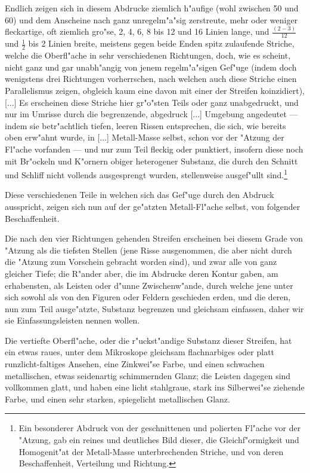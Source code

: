 \documentclass[a4paper, 11pt, oneside, german]{article}
\begin{document}
Endlich zeigen sich in diesem Abdrucke ziemlich h"aufige (wohl zwischen 50 und 60) und dem Anscheine nach ganz unregelm"a"sig zerstreute, mehr oder weniger fleckartige, oft ziemlich gro"se, 2, 4, 6, 8 bis 12 und 16 Linien lange, und $\frac{(2-3)}{12}$ und $\frac{1}{2}$ bis 2 Linien breite, meistens gegen beide Enden spitz zulaufende Striche, welche die Oberfl"ache in sehr verschiedenen Richtungen, doch, wie es scheint, nicht ganz und gar unabh"angig von jenem regelm"a"sigen Gef"uge (indem doch wenigstens drei Richtungen vorherrschen, nach welchen auch diese Striche einen Parallelismus zeigen, obgleich kaum eine davon mit einer der Streifen koinzidiert), [...] Es erscheinen diese Striche hier gr"o"sten Teils oder ganz unabgedruckt, und nur im Umrisse durch die begrenzende, abgedruck [...] Umgebung angedeutet --- indem sie betr"achtlich tiefen, leeren Rissen entsprechen, die sich, wie bereits oben erw"ahnt wurde, in [...] Metall-Masse selbst, schon vor der "Atzung der Fl"ache vorfanden --- und nur zum Teil fleckig oder punktiert, insofern diese noch mit Br"ockeln und K"ornern obiger heterogener Substanz, die durch den Schnitt und Schliff nicht vollends ausgesprengt wurden, stellenweise ausgef"ullt sind.\footnote{Ein besonderer Abdruck von der geschnittenen und polierten Fl"ache vor der "Atzung, gab ein reines und deutliches Bild dieser, die Gleichf"ormigkeit und Homogenit"at der Metall-Masse unterbrechenden Striche, und von deren Beschaffenheit, Verteilung und Richtung.}

Diese verschiedenen Teile in welchen sich das Gef"uge durch den Abdruck ausspricht, zeigen sich nun auf der ge"atzten Metall-Fl"ache selbst, von folgender Beschaffenheit.

Die nach den vier Richtungen gehenden Streifen erscheinen bei diesem Grade von "Atzung als die tiefsten Stellen (jene Risse ausgenommen, die aber nicht durch die "Atzung zum Vorschein gebracht worden sind), und zwar alle von ganz gleicher Tiefe; die R"ander aber, die im Abdrucke deren Kontur gaben, am erhabensten, als Leisten oder d"unne Zwischenw"ande, durch welche jene unter sich sowohl als von den Figuren oder Feldern geschieden erden, und die deren, nun zum Teil ausge"atzte, Substanz begrenzen und gleichsam einfassen, daher wir sie Einfassungsleisten nennen wollen.

Die vertiefte Oberfl"ache, oder die r"uckst"andige Substanz dieser Streifen, hat ein etwas raues, unter dem Mikroskope gleichsam flachnarbiges oder platt runzlicht-faltiges Ansehen, eine Zinkwei"se Farbe, und einen schwachen metallischen, etwas seidenartig schimmernden Glanz; die Leisten dagegen sind vollkommen glatt, und haben eine licht stahlgraue, stark ins Silberwei"se ziehende Farbe, und einen sehr starken, spiegelicht metallischen Glanz.
\end{document}
